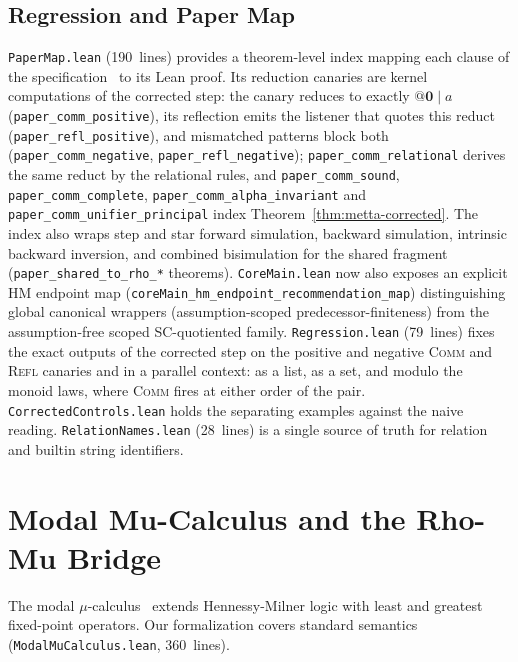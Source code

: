 \documentclass[11pt]{article}
\theoremstyle{definition}
\theoremstyle{remark}
\begin{document}
\subsection{Regression and Paper Map}

\texttt{PaperMap.lean} (190~lines) provides a theorem-level index mapping
each clause of the specification~\cite{MeredithMeTTaCalculus2024} to its
Lean proof.  Its reduction canaries are kernel computations of the
corrected step: the canary reduces to exactly
$@\mathbf{0} \mathbin{|} a$ (\texttt{paper\_comm\_positive}), its
reflection emits the listener that quotes this reduct
(\texttt{paper\_refl\_positive}), and mismatched patterns block both
(\texttt{paper\_comm\_negative}, \texttt{paper\_refl\_negative});
\texttt{paper\_comm\_relational} derives the same reduct by the relational
rules, and \texttt{paper\_comm\_sound}, \texttt{paper\_comm\_complete},
\texttt{paper\_comm\_alpha\_invariant} and
\texttt{paper\_comm\_unifier\_principal} index
Theorem~\ref{thm:metta-corrected}.  The index also wraps step and star
forward simulation, backward simulation, intrinsic backward inversion,
and combined bisimulation for the shared fragment
(\texttt{paper\_shared\_to\_rho\_*} theorems).
\texttt{CoreMain.lean} now also exposes an explicit HM endpoint map
(\texttt{coreMain\_hm\_endpoint\_recommendation\_map}) distinguishing global
canonical wrappers (assumption-scoped predecessor-finiteness) from the
assumption-free scoped SC-quotiented family.
\texttt{Regression.lean} (79~lines) fixes the exact outputs of the
corrected step on the positive and negative \textsc{Comm} and \textsc{Refl}
canaries and in a parallel context: as a list, as a set, and modulo the
monoid laws, where \textsc{Comm} fires at either order of the pair.
\texttt{CorrectedControls.lean} holds the separating examples against the
naive reading.
\texttt{RelationNames.lean} (28~lines) is a single source of truth for
relation and builtin string identifiers.


\section{Modal Mu-Calculus and the Rho-Mu Bridge}
\label{sec:mu-bridge}

The modal $\mu$-calculus~\cite{Kozen1983,BradfieldStirling2007} extends
Hennessy-Milner logic with least and greatest fixed-point operators.
Our formalization covers standard semantics
(\texttt{ModalMuCalculus.lean}, 360~lines).
\end{document}
